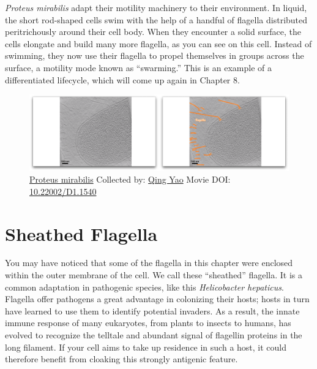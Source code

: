 \documentclass[]{tufte-book}
\begin{document}
\emph{Proteus mirabilis} adapt their motility machinery to their
environment. In liquid, the short rod-shaped cells swim with the help of
a handful of flagella distributed peritrichously around their cell body.
When they encounter a solid surface, the cells elongate and build many
more flagella, as you can see on this cell. Instead of swimming, they
now use their flagella to propel themselves in groups across the
surface, a motility mode known as ``swarming.'' This is an example of a
differentiated lifecycle, which will come up again in Chapter 8.





\begin{figure}
\includegraphics{movie_stills/6_5a} \caption[\protect\hyperlink{tree}{Proteus mirabilis} Collected by:
\protect\hyperlink{qing_yao}{Qing Yao} Movie DOI:
\href{https://doi.org/10.22002/D1.1540}{10.22002/D1.1540}]{\protect\hyperlink{tree}{Proteus mirabilis} Collected by:
\protect\hyperlink{qing_yao}{Qing Yao} Movie DOI:
\href{https://doi.org/10.22002/D1.1540}{10.22002/D1.1540}}\label{fig:6-5a}
\end{figure}

\section{Sheathed Flagella}\label{sheathed-flagella}

You may have noticed that some of the flagella in this chapter were
enclosed within the outer membrane of the cell. We call these
``sheathed'' flagella. It is a common adaptation in pathogenic species,
like this \emph{Helicobacter hepaticus}. Flagella offer pathogens a
great advantage in colonizing their hosts; hosts in turn have learned to
use them to identify potential invaders. As a result, the innate immune
response of many eukaryotes, from plants to insects to humans, has
evolved to recognize the telltale and abundant signal of flagellin
proteins in the long filament. If your cell aims to take up residence in
such a host, it could therefore benefit from cloaking this strongly
antigenic feature.
\end{document}
